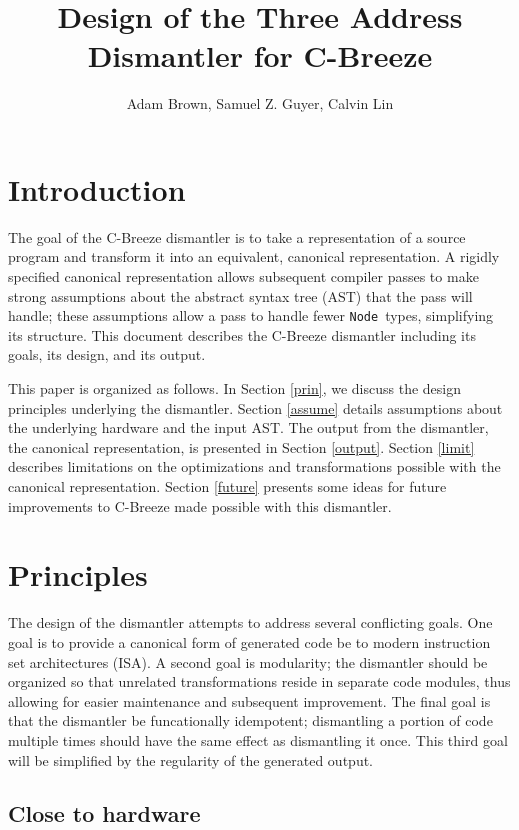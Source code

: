 \documentclass{article}
\title{Design of the Three Address Dismantler for C-Breeze}
\author{Adam Brown, Samuel Z. Guyer, Calvin Lin}
\newcommand{\node}{\texttt{Node}}
\begin{document}
\maketitle

\section{Introduction}

The goal of the C-Breeze dismantler is to take a representation of a
source program and transform it into an equivalent, canonical
representation.  A rigidly specified canonical representation allows
subsequent compiler passes to make strong assumptions about the
abstract syntax tree (AST) that the pass will handle; these
assumptions allow a pass to handle fewer \node\ types, simplifying its
structure.  This document describes the C-Breeze dismantler including
its goals, its design, and its output.

This paper is organized as follows.  In Section \ref{prin}, we discuss
the design principles underlying the dismantler.  Section
\ref{assume} details assumptions about the underlying hardware and the
input AST.  The output from the dismantler, the canonical
representation, is presented in Section \ref{output}.  Section
\ref{limit} describes limitations on the optimizations and
transformations possible with the canonical representation.  Section
\ref{future} presents some ideas for future improvements to C-Breeze
made possible with this dismantler.

\section{\label{prin} Principles}

The design of the dismantler attempts to address several conflicting
goals.  One goal is to provide a canonical form of generated code be
to modern instruction set architectures (ISA).  A second goal is
modularity; the dismantler should be organized so that unrelated
transformations reside in separate code modules, thus allowing for
easier maintenance and subsequent improvement.  The final goal is that
the dismantler be funcationally idempotent; dismantling a portion of
code multiple times should have the same effect as dismantling it
once.  This third goal will be simplified by the regularity of the
generated output.

\subsection{\label{prin:close-to-hardware} Close to hardware}
\end{document}
